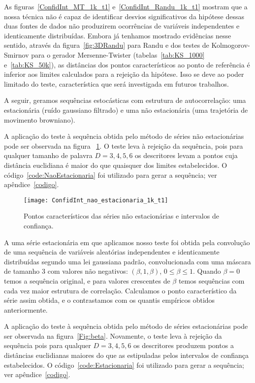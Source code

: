 As figuras~\ref{ConfidInt_MT_1k_t1} e~\ref{ConfidInt_Randu_1k_t1} mostram que a nossa técnica não é capaz de identificar desvios significativos da hipótese dessas duas fontes de dados não produzirem ocorrências de variáveis independentes e identicamente distribuídas.
Embora já tenhamos mostrado evidências nesse sentido, através da figura~\ref{fig:3DRandu} para Randu e dos testes de Kolmogorov-Smirnov para o gerador Mersenne-Twister (tabelas~\ref{tab:KS_1000} e~\ref{tab:KS_50k}), as distâncias dos pontos característicos ao ponto de referência é inferior aos limites calculados para a rejeição da hipótese.
Isso se deve ao poder limitado do teste, característica que será investigada em futuros trabalhos.

A seguir, geramos sequências estocásticas com estrutura de autocorrelação: uma estacionária (ruído gaussiano filtrado) e uma não estacionária (uma trajetória de movimento browniano).

A aplicação do teste à sequência obtida pelo método de séries não estacionárias pode ser observada na figura ~\ref{Fig:ConfidInt_nao_estacionaria_1k_t1}.
O teste leva à rejeição da sequência, pois para qualquer tamanho de palavra $D= 3, 4, 5, 6$ os descritores levam a pontos cuja distância euclidiana é maior do que quaisquer dos limites estabelecidos. 
O código~\ref{code:NaoEstacionaria} foi utilizado para gerar a sequência; ver apêndice~\ref{codigo}.


\begin{figure}
	\centering
	\texttt{[image: ConfidInt\_nao\_estacionaria\_1k\_t1]}
	\caption{Pontos característicos das séries não estacionárias e intervalos de confiança.}\label{Fig:ConfidInt_nao_estacionaria_1k_t1}
\end{figure}

A uma série estacionária em que aplicamos nosso teste foi obtida pela convolução de uma sequência de variáveis aleatórias independentes e identicamente distribuídas segundo uma lei gaussiana padrão, convolucionada com uma máscara de tamanho \num{3} com valores não negativos: $(\beta,1,\beta)$, $0\leq \beta\leq 1$.
Quando $\beta=0$ temos a sequência original, e para valores crescentes de $\beta$ temos sequências com cada vez maior estrutura de correlação.
Calculamos o ponto característico da série assim obtida, e o contrastamos com os quantis empíricos obtidos anteriormente.

A aplicação do teste à sequência obtida pelo método de séries estacionárias pode ser observada na figura~\ref{Fig:beta}.
Novamente, o teste leva à rejeição da sequência pois para qualquer $D= 3, 4, 5, 6$ os descritores produzem pontos a distâncias euclidianas maiores do que as estipuladas pelos intervalos de confiança estabelecidos. 
O código~\ref{code:Estacionaria} foi utilizado para gerar a sequência; ver apêndice~\ref{codigo}.

